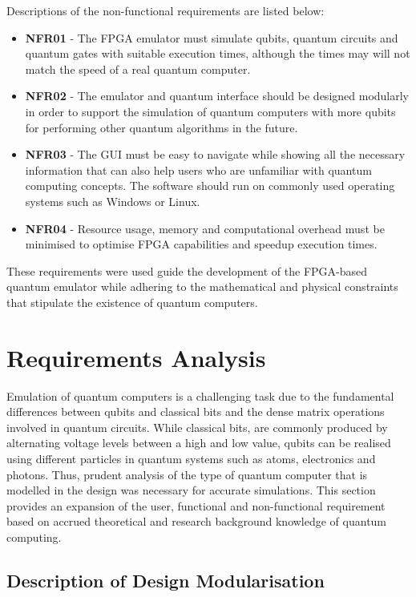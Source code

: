 Descriptions of the non-functional requirements are listed below:
\begin{itemize}
	\item 
	\textbf{NFR01} - The FPGA emulator must simulate qubits, quantum circuits and quantum gates with suitable execution times, although the times may will not match the speed of a real quantum computer.
	\item 
	\textbf{NFR02} - The emulator and quantum interface should be designed modularly in order to support the simulation of quantum computers with more qubits for performing other quantum algorithms in the future.
	\item 
	\textbf{NFR03} - The GUI must be easy to navigate while showing all the necessary information that can also help users who are unfamiliar with quantum computing concepts. The software should run on commonly used operating systems such as Windows or Linux.
	\item 
	\textbf{NFR04} - Resource usage, memory and computational overhead must be minimised to optimise FPGA capabilities and speedup execution times.
\end{itemize}

These requirements were used guide the development of the FPGA-based quantum emulator while adhering to the mathematical and physical constraints that stipulate the existence of quantum computers. 

\section{Requirements Analysis \label{sec:method-req-analysis}}

Emulation of quantum computers is a challenging task due to the fundamental differences between qubits and classical bits and the dense matrix operations involved in quantum circuits. While classical bits, are commonly produced by alternating voltage levels between a high and low value, qubits can be realised using different particles in quantum systems such as atoms, electronics and photons. Thus, prudent analysis of the type of quantum computer that is modelled in the design was necessary for accurate simulations. This section provides an expansion of the user, functional and non-functional requirement based on accrued theoretical and research background knowledge of quantum computing. 

\subsection{Description of Design Modularisation}

